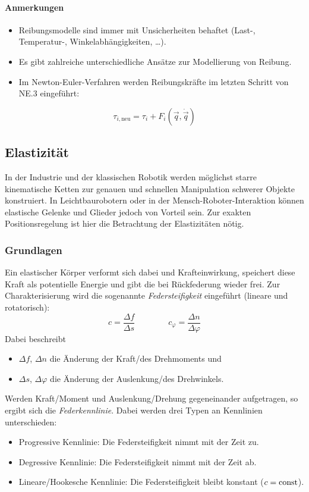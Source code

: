 				\paragraph{Anmerkungen}
					\begin{itemize}
						\item Reibungsmodelle sind immer mit Unsicherheiten behaftet (Last-, Temperatur-, Winkelabhängigkeiten, \dots).
						\item Es gibt zahlreiche unterschiedliche Ansätze zur Modellierung von Reibung.
						\item Im Newton-Euler-Verfahren werden Reibungskräfte im letzten Schritt von NE.3 eingeführt:
					\end{itemize}
					\begin{equation*}
						\tau_{i, \text{neu}} = \tau_i + F_i(\vec{q}, \dot{\vec{q}}\!)
					\end{equation*}

		\subsection{Elastizität}
			In der Industrie und der klassischen Robotik werden möglichst starre kinematische Ketten zur genauen und schnellen Manipulation schwerer Objekte konstruiert. In Leichtbaurobotern oder in der Mensch-Roboter-Interaktion können elastische Gelenke und Glieder jedoch von Vorteil sein. Zur exakten Positionsregelung ist hier die Betrachtung der Elastizitäten nötig.

			\subsubsection{Grundlagen}
				Ein elastischer Körper verformt sich dabei und Krafteinwirkung, speichert diese Kraft als potentielle Energie und gibt die bei Rückfederung wieder frei. Zur Charakterisierung wird die sogenannte \emph{Federsteifigkeit} eingeführt (lineare und rotatorisch):
				\begin{equation*}
					c = \frac{\Delta f}{\Delta s} \quad\quad\quad\quad c_\varphi = \frac{\Delta n}{\Delta \varphi}
				\end{equation*}
				Dabei beschreibt
				\begin{itemize}
					\item \( \Delta f \), \( \Delta n \) die Änderung der Kraft/des Drehmoments und
					\item \( \Delta s \), \( \Delta \varphi \) die Änderung der Auslenkung/des Drehwinkels.
				\end{itemize}
				Werden Kraft/Moment und Auslenkung/Drehung gegeneinander aufgetragen, so ergibt sich die \emph{Federkennlinie}. Dabei werden drei Typen an Kennlinien unterschieden:
				\begin{itemize}
					\item Progressive Kennlinie: Die Federsteifigkeit nimmt mit der Zeit zu.
					\item Degressive Kennlinie: Die Federsteifigkeit nimmt mit der Zeit ab.
					\item Lineare/Hookesche Kennlinie: Die Federsteifigkeit bleibt konstant (\dh \( c = \operatorname{const} \)).
				\end{itemize}

